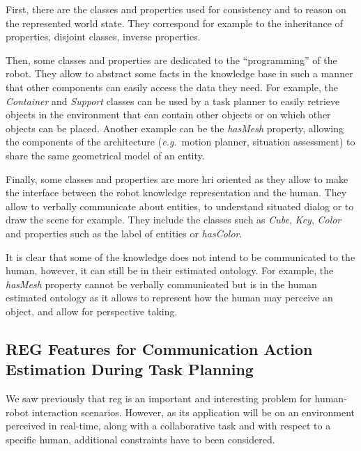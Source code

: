 \documentclass[a4paper,11pt,twoside]{StyleThese}
\begin{document}
First, there are the classes and properties used for consistency and to reason on the represented world state. They correspond for example to the inheritance of properties, disjoint classes, inverse properties. 

Then, some classes and properties are dedicated to the ``programming'' of the robot. They allow to abstract some facts in the knowledge base in such a manner that other components can easily access the data they need. For example, the \textit{Container} and \textit{Support} classes can be used by a task planner to easily retrieve objects in the environment that can contain other objects or on which other objects can be placed. Another example can be the \textit{hasMesh} property, allowing the components of the architecture (\textit{e.g.}~motion planner, situation assessment) to share the same geometrical model of an entity.

Finally, some classes and properties are more \acrshort{hri} oriented as they allow to make the interface between the robot knowledge representation and the human. They allow to verbally communicate about entities, to understand situated dialog or to draw the scene for example. They include the classes such as \textit{Cube}, \textit{Key}, \textit{Color} and properties such as the label of entities or \textit{hasColor}.

It is clear that some of the knowledge does not intend to be communicated to the human, however, it can still be in their estimated ontology. For example, the \textit{hasMesh} property cannot be verbally communicated but is in the human estimated ontology as it allows to represent how the human may perceive an object, and allow for perspective taking.


\subsection{REG Features for Communication Action Estimation During Task Planning}
We saw previously that \acrshort{reg} is an important and interesting problem for human-robot interaction scenarios. However, as its application will be on an environment perceived in real-time, along with a collaborative task and with respect to a specific human, additional constraints have to been considered.
\end{document}
